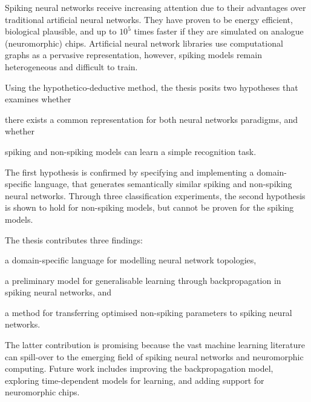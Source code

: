 Spiking neural networks receive increasing attention
due to their advantages over traditional artificial
neural networks.
They have proven to be 
energy efficient,
biological plausible, and 
up to $10^5$ times faster if they are simulated on analogue 
(neuromorphic) chips.
Artificial neural network libraries use computational graphs
as a pervasive representation, however, spiking models remain heterogeneous and 
difficult to train.

Using the hypothetico-deductive method, the thesis posits 
two hypotheses that examines whether 
\begin{enumerate*}[label={\arabic*)}]
\item there exists a common representation for both neural networks paradigms, and whether
\item spiking and non-spiking models can learn a simple recognition task.
\end{enumerate*}
The first hypothesis is confirmed by specifying and implementing a domain-specific language,
that generates semantically similar spiking and non-spiking
neural networks.
Through three classification experiments, the second hypothesis is shown to hold
for non-spiking models, but cannot be proven for the spiking models.

The thesis contributes three findings: 
\begin{enumerate*}[label={\arabic*)}]
\item a domain-specific language for modelling neural network topologies,
\item a preliminary model for generalisable learning through backpropagation in
spiking neural networks, and
\item a method for transferring optimised non-spiking parameters to spiking
neural networks.
\end{enumerate*}

The latter contribution is promising because the vast machine learning
literature can spill-over to the emerging field of spiking neural networks and
neuromorphic computing.
Future work includes improving the backpropagation model, exploring time-dependent
models for learning, and adding support for neuromorphic chips.

